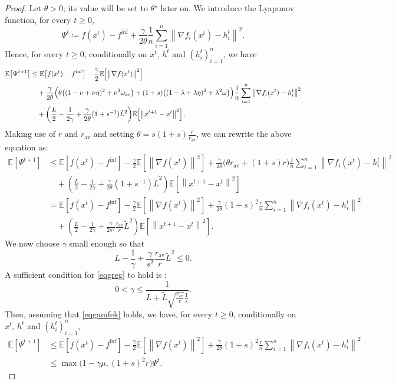 \documentclass{article} %
\newcommand{\eqdef}{\coloneqq}
\theoremstyle{plain}
\theoremstyle{definition}
\theoremstyle{remark}
\newcommand{\sqnorm}[1]{\left\| #1 \right\|^2}
\newcommand{\Exp}[1]{\mathbb{E}\!\left[ #1 \right]}
\newcommand{\oma}{\omega_{\mathrm{av}}}
\begin{document}
\begin{proof}
   Let $\theta>0$; its value will be set to $\theta^\star$ later on. We introduce the Lyapunov function, for every $t\geq 0$,
   \begin{equation*}
   \Psi^t \eqdef f(x^t)-f^{\inf} + \frac{\gamma}{2\theta}  \frac{1}{n}\sum_{i=1}^n \sqnorm{\nabla f_i(x^t)-h_i^{t}}.
   \end{equation*}
   Hence, for every $t\geq 0$, conditionally on $x^t$, $h^t$ and $(h_i^t)_{i=1}^n$, we have
   \begin{align}
   \Exp{\Psi^{t+1}} &\leq \Exp{f(x^t) - f^{\inf}} - \frac{\gamma}{2} \Exp{\sqnorm{\nabla f(x^t)}}\notag \\
   &\quad +\frac{ \gamma }{2\theta}\Big( \theta\big((1-\nu+\nu\eta)^2+\nu^2\oma\big)\notag+(1+s)\big((1-\lambda+\lambda\eta)^2+\lambda^2\omega\big)
   \Big) \frac{1}{n}\sum_{i=1}^n \sqnorm{\nabla f_i(x^t)-h_i^{t}}\label{eqq1}\\
   &\quad+ \left(\frac{ L}{2}-\frac{1}{2\gamma}+\frac{\gamma}{2\theta}(1+s^{-1})\tilde{L}^2\right)\!\Exp{\sqnorm{x^{t+1}-x^t}}.\notag
   \end{align}
   Making use of $r$ and $r_{\mathrm{av}}$ and setting $\theta = s(1+s)\frac{r}{r_{\mathrm{av}}}$, 
   we can rewrite the above equation as:
   \begin{align*}
   \Exp{\Psi^{t+1}} &\leq \Exp{f(x^t) - f^{\inf}} - \frac{\gamma}{2} \Exp{\sqnorm{\nabla f(x^t)}} +\frac{ \gamma }{2\theta}\Big( \theta r_{\mathrm{av}}
   +(1+s)r
   \Big) \frac{1}{n}\sum_{i=1}^n \sqnorm{\nabla f_i(x^t)-h_i^{t}}\\
   &\quad+ \left(\frac{ L}{2}-\frac{1}{2\gamma}+\frac{\gamma}{2\theta}(1+s^{-1})\tilde{L}^2\right)\!\Exp{\sqnorm{x^{t+1}-x^t}}\\
   &=\Exp{f(x^t) - f^{\inf}} - \frac{\gamma}{2} \Exp{\sqnorm{\nabla f(x^t)}} +\frac{ \gamma }{2\theta} (1+s)^2 
   \frac{r}{n}\sum_{i=1}^n \sqnorm{\nabla f_i(x^t)-h_i^{t}}\\
   &\quad+ \left(\frac{ L}{2}-\frac{1}{2\gamma}+\frac{\gamma}{2s^2}\frac{r_{\mathrm{av}}}{r}\tilde{L}^2\right)\!\Exp{\sqnorm{x^{t+1}-x^t}}.
   \end{align*}
   We now choose $\gamma$ small enough so that 
   \begin{equation}
   L-\frac{1}{\gamma}+\frac{\gamma}{s^2}\frac{r_{\mathrm{av}}}{r}\tilde{L}^2 \leq 0.\label{eqgreg}
   \end{equation}
   A sufficient condition for \eqref{eqgreg} to hold is \citep[Lemma 5]{ric21}:
   \begin{equation}
   0<\gamma \leq \frac{1}{L+\tilde{L}\sqrt{\frac{r_{\mathrm{av}}}{r}}\frac{1}{s}}.\label{eqgamfek}
   \end{equation}
   Then, assuming that \eqref{eqgamfek} holds, we have, for every $t\geq 0$, conditionally on $x^t$, $h^t$ and $(h_i^t)_{i=1}^n$,
   \begin{align*}
   \Exp{\Psi^{t+1}} &\leq \Exp{f(x^t) - f^{\inf}} - \frac{\gamma}{2} \Exp{\sqnorm{\nabla f(x^t)}} +\frac{ \gamma }{2\theta} (1+s)^2 
   \frac{r}{n}\sum_{i=1}^n \sqnorm{\nabla f_i(x^t)-h_i^{t}}\\
   &\leq \max\big(1-\gamma\mu,(1+s)^2 r\big)  \Psi^t.
   \end{align*}



\end{proof}
\end{document}
